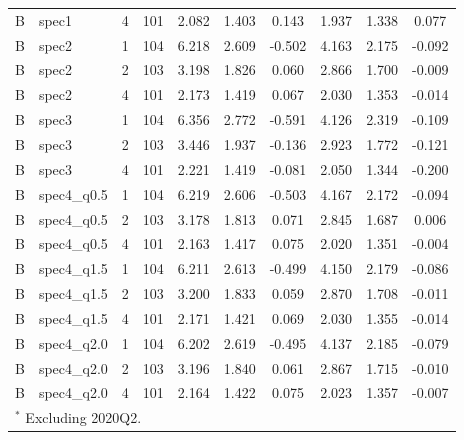 \begin{table}[htbp]
\begin{tabular}{llrccccccc}
  B & spec1 & 4 & 101 & 2.082 & 1.403 & 0.143 & 1.937 & 1.338 & 0.077 \\
  B & spec2 & 1 & 104 & 6.218 & 2.609 & -0.502 & 4.163 & 2.175 & -0.092 \\
  B & spec2 & 2 & 103 & 3.198 & 1.826 & 0.060 & 2.866 & 1.700 & -0.009 \\
  B & spec2 & 4 & 101 & 2.173 & 1.419 & 0.067 & 2.030 & 1.353 & -0.014 \\
  B & spec3 & 1 & 104 & 6.356 & 2.772 & -0.591 & 4.126 & 2.319 & -0.109 \\
  B & spec3 & 2 & 103 & 3.446 & 1.937 & -0.136 & 2.923 & 1.772 & -0.121 \\
  B & spec3 & 4 & 101 & 2.221 & 1.419 & -0.081 & 2.050 & 1.344 & -0.200 \\
  B & spec4_q0.5 & 1 & 104 & 6.219 & 2.606 & -0.503 & 4.167 & 2.172 & -0.094 \\
  B & spec4_q0.5 & 2 & 103 & 3.178 & 1.813 & 0.071 & 2.845 & 1.687 & 0.006 \\
  B & spec4_q0.5 & 4 & 101 & 2.163 & 1.417 & 0.075 & 2.020 & 1.351 & -0.004 \\
  B & spec4_q1.5 & 1 & 104 & 6.211 & 2.613 & -0.499 & 4.150 & 2.179 & -0.086 \\
  B & spec4_q1.5 & 2 & 103 & 3.200 & 1.833 & 0.059 & 2.870 & 1.708 & -0.011 \\
  B & spec4_q1.5 & 4 & 101 & 2.171 & 1.421 & 0.069 & 2.030 & 1.355 & -0.014 \\
  B & spec4_q2.0 & 1 & 104 & 6.202 & 2.619 & -0.495 & 4.137 & 2.185 & -0.079 \\
  B & spec4_q2.0 & 2 & 103 & 3.196 & 1.840 & 0.061 & 2.867 & 1.715 & -0.010 \\
  B & spec4_q2.0 & 4 & 101 & 2.164 & 1.422 & 0.075 & 2.023 & 1.357 & -0.007 \\
\bottomrule
\multicolumn{10}{l}{\footnotesize $^*$ Excluding 2020Q2.} \\
\end{tabular}
\end{table}